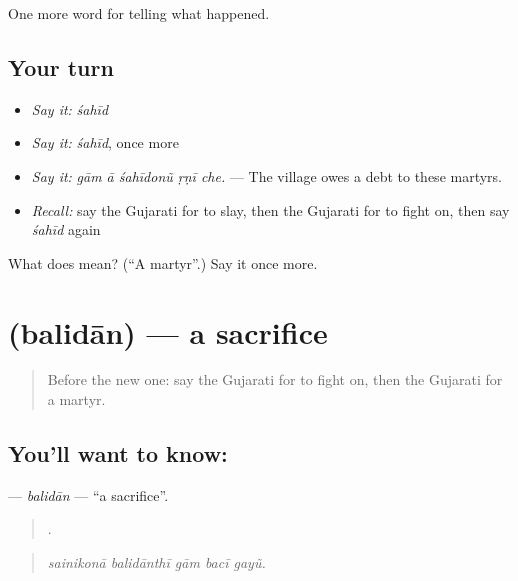 \begin{grammarlens}[title={What you've built}]
One more word for telling what happened.
\end{grammarlens}

\subsection*{Your turn}
\begin{itemize}
\raggedright
  \item \emph{Say it:} \emph{śahīd}
  \item \emph{Say it:} \emph{śahīd}, once more
  \item \emph{Say it:} \emph{gām ā śahīdonũ ṛṇī che.} — The village owes a debt to these martyrs.
  \item \emph{Recall:} say the Gujarati for to slay, then the Gujarati for to fight on, then say \emph{śahīd} again
\end{itemize}

\begin{tcolorbox}[breakable,colback=teal!4,colframe=teal!35!black,title={Before you move on}]
What does  mean? (\textquotedblleft{}A martyr\textquotedblright{}.) Say it once more.
\end{tcolorbox}
\section[\texorpdfstring{\gu{બલિદાન} (balidān)}{બલિદાન (balidān)}]{ (balidān) — a sacrifice}

\label{lesson:GU-C323-balidan}



\begin{quote}
Before the new one: say the Gujarati for to fight on, then the Gujarati for a martyr.
\end{quote}

\subsection*{You'll want to know: }
\textbf{} — \emph{balidān} — \textquotedblleft{}a sacrifice\textquotedblright{}.

\begin{quote}
    .
\end{quote}

\begin{quote}
\emph{sainikonā balidānthī gām bacī gayũ.}
\end{quote}

